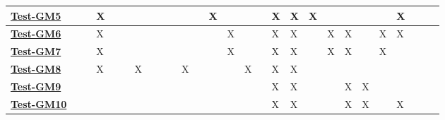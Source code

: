 \documentclass[12pt, titlepage]{article}
\begin{document}
\begin{landscape}
\begin{table}[H]
\begin{adjustwidth}{-0.0in}{-1in}
{\begin{tabular}{l|l|l|l|l|l|l|l|l|l|l|l|l|l|l|l|l|l|l|l|l|l|l|l|l|l|l|}
\multicolumn{1}{|l|}{\hyperref[Test-GM5]{\textbf{Test-GM5}}}  &              &              & X            &              &              &              &              &              &              &               &               & X             &               &               &               & X             & X             & X             &               &               &               &               & X           &             &             &             \\ \hline
\multicolumn{1}{|l|}{\hyperref[Test-GM6]{\textbf{Test-GM6}}}  &              &              & X            &              &              &              &              &              &              &               &               &               & X             &               &               & X             & X             &               & X             & X             &               & X             & X           &             &             &             \\ \hline
\multicolumn{1}{|l|}{\hyperref[Test-GM17]{\textbf{Test-GM7}}}  &              &              & X            &              &              &              &              &              &              &               &               &               & X             &               &               & X             & X             &               & X             & X             &               & X             &             &             &             &             \\ \hline
\multicolumn{1}{|l|}{\hyperref[Test-GM8]{\textbf{Test-GM8}}} &              &              & X            &              &              & X            &              &              &              & X             &               &               &               & X             &               & X             & X             &               &               &               &               &               &             &             &             &             \\ \hline
\multicolumn{1}{|l|}{\hyperref[Test-GM9]{\textbf{Test-GM9}}}  &              &              &              &              &              &              &              &              &              &               &               &               &               &               &               & X             & X             &               &               & X             & X             &               &             &             &             &             \\ \hline
\multicolumn{1}{|l|}{\hyperref[Test-GM10]{\textbf{Test-GM10}}} &              &              &              &              &              &              &              &              &              &               &               &               &               &               &               & X             & X             &               &               & X             & X             &               & X           &             &             &             \\ \hline

\end{tabular}}
\end{adjustwidth}
\end{table}
\end{landscape}
\end{document}
